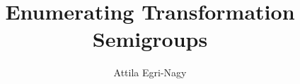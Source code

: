 \documentclass{amsart}
\author{Attila Egri-Nagy}
\title{Enumerating Transformation Semigroups}
\newcommand{\cT}{{\mathcal T}}
\theoremstyle{plain}
\theoremstyle{definition}
\begin{document}
\begin{abstract}
\end{abstract}

\maketitle
\end{document}
